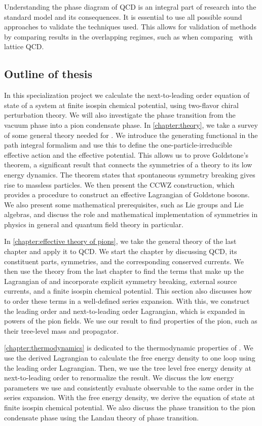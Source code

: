 Understanding the phase diagram of QCD is an integral part of research into the standard model and its consequences.
It is essential to use all possible sound approaches to validate the techniques used.
This allows for validation of methods by comparing results in the overlapping regimes, such as when comparing \chpt\ with lattice QCD.


\subsection*{Outline of thesis}
In this specialization project we calculate the next-to-leading order equation of state of a system at finite isospin chemical potential, using two-flavor chiral perturbation theory.
We will also investigate the phase transition from the vacuum phase into a pion condensate phase.
In \autoref{chapter:theory}, we take a survey of some general theory needed for \chpt.
We introduce the generating functional in the path integral formalism and use this to define the one-particle-irreducible effective action and the effective potential.
This allows us to prove Goldstone's theorem, a significant result that connects the symmetries of a theory to its low energy dynamics.
The theorem states that spontaneous symmetry breaking gives rise to massless particles.
We then present the CCWZ construction, which provides a procedure to construct an effective Lagrangian of Goldstone bosons.
We also present some mathematical prerequisites, such as Lie groups and Lie algebras, and discuss the role and mathematical implementation of symmetries in physics in general and quantum field theory in particular.

In \autoref{chapter:effective theory of pions}, we take the general theory of the last chapter and apply it to QCD.
We start the chapter by discussing QCD, its constituent parts, symmetries, and the corresponding conserved currents.
We then use the theory from the last chapter to find the terms that make up the Lagrangian of \chpt and incorporate explicit symmetry breaking, external source currents, and a finite isospin chemical potential.
This section also discusses how to order these terms in a well-defined series expansion.
With this, we construct the leading order and next-to-leading order Lagrangian, which is expanded in powers of the pion fields.
We use our result to find properties of the pion, such as their tree-level mass and propagator.

\cref{chapter:thermodynamics} is dedicated to the thermodynamic properties of \chpt.
We use the derived Lagrangian to calculate the free energy density to one loop using the leading order Lagrangian.
Then, we use the tree level free energy density at next-to-leading order to renormalize the result.
We discuss the low energy parameters we use and consistently evaluate observable to the same order in the series expansion.
With the free energy density, we derive the equation of state at finite isospin chemical potential.
We also discuss the phase transition to the pion condensate phase using the Landau theory of phase transition.

